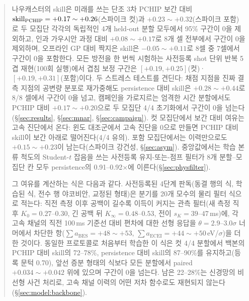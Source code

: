 \documentclass[10pt,a4paper]{article}
\begin{document}
\begin{abstract}
\begin{fielddesc}[5.4em]
\item[주장 1: 이온온도] 나우캐스터의 \Ti{} skill은 미래를 쓰는 단조 3차 PCHIP 보간 대비
$\skillp = +0.17\sim+0.26$(스파이크 컷)과 $+0.23\sim+0.32$(스파이크 포함)로 두
모집단 각각의 독립적인 4개 held-out 분할 모두에서 95\% 구간이 0을 제외하고, 인과
가우시안 과정 대비 $+0.08\sim+0.17$로 8개 셀 전부에서 구간이 0을 제외하며, 오프라인 GP
대비 짝지은 skill은 $-0.05\sim+0.11$로 8셀 중 7셀에서 구간이 0을 포함한다. 모든
방전을 한 번씩 시험하는 사전등록 shot 단위 반복 5겹 재현(100회 실행)에서 겹침 보정
구간은 $[+0.19, +0.25]$(컷)·$[+0.19, +0.31]$(포함)이다. 두 스트레스 테스트를 견딘다:
채점 지점을 진짜 결측 지점의 공변량 분포로 재가중해도 persistence 대비 skill은
$+0.28\sim+0.44$로 8/8 셀에서 구간이 0을 넘고, 캠페인을 가로지르는 엄격한 시간
분할에서도 PCHIP 대비 $+0.17\sim+0.20$으로 두 모집단 4/4 초기화에서 구간이 0을
넘는다(\S\ref{sec:results}, \S\ref{sec:mnar}, \S\ref{sec:campaign}). 컷 모집단에서
보간 대비 여유는 고속 진단에서 온다: 윈도 대조군에서 고속 진단을 0으로 만들면 PCHIP
대비 skill이 보간 아래로 떨어진다(4/4 유의). 포함 모집단에서는 이력만으로도
$+0.15\sim+0.23$이 남는다(스파이크 강건성, \S\ref{sec:asym}). 중앙값에서는 학습 본류
척도의 Student-$t$ 잡음을 쓰는 사전등록 유지-또는-점프 필터가 8개 분할--모집단 칸
모두 persistence의 0.91--0.92$\times$에 이른다(\S\ref{sec:physfilter}).

\item[주장 1의 식] 그 여유를 계산하는 식은 다음과 같다. 사전등록된 4단계
판독(동결 행의 식, 학습된 식, 전수 행 야코비안, 교정된 형태)은 \Ti{} 분기를 20개
모수의 물리 필터 식으로 적는다: 직전 측정 이후 공백이 길수록 이득이 커지는 관측
필터(새 측정 직후 $K_0 = 0.27$--$0.30$, 긴 공백 뒤 $K_\infty = 0.48$--$0.53$, 전이
$s_K = 39$--$47$\,ms)에, 각 고속 채널의 직전 100\,ms 기준선 대비 편차에 대한 선형
응답을 $\theta = 2.9$--$3.0\sigma$ 너머에서 차단한 항($\sum a_{\mathrm{BES}} = +48 \sim
+53$, $\sum a_{\mathrm{ECEI}} = +44 \sim +50$\,eV/$\sigma$)을 더한 것이다. 동일한
프로토콜로 처음부터 학습한 이 식은 컷 4/4 분할에서 백본의 PCHIP 대비 skill의
72--78\%, persistence 대비 skill의 87--90\%를 유지하고(등록 문턱 0.70), 앞선 증분
형태의 식보다 모든 분할에서 paired $+0.034\sim+0.042$ 위에 있으며 구간이 0을
넘는다. 남은 22--28\%는 신경망의 비선형 사건 처리로, 고속 채널 이력의 어떤 저차
함수로도 재현되지 않는다(\S\ref{sec:model:backbone}).


\end{fielddesc}
\end{abstract}
\end{document}

